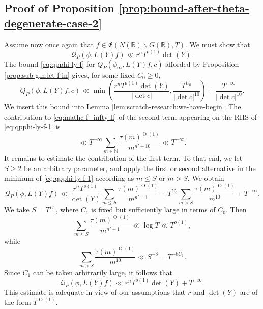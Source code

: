 \documentclass[reqno]{amsart}
\def\O{\operatorname{O}}
\theoremstyle{plain} \newtheorem{theorem} {Theorem}
\theoremstyle{definition} \newtheorem{definition} [theorem] {Definition}
\theoremstyle{itplain} %
\numberwithin{equation}{section}
\numberwithin{theorem}{section}
\renewcommand{\geq}{\geqslant}
\renewcommand{\leq}{\leqslant}
\begin{document}
\subsection{Proof of Proposition \ref{prop:bound-after-theta-degenerate-case-2}}
Assume now once again that $f \in \mathfrak{E}(N(\mathbb{R}) \backslash G(\mathbb{R}), T)$.  We must show that
\begin{equation*}
  \mathcal{Q}_P(\phi,L(Y) f)
  \ll
  r^{n} T^{o(1)} \det(Y).
\end{equation*}
The bound \eqref{eq:qpphi-ly-f} for $Q_P(\phi_\infty, L(Y) f, c)$ afforded by Proposition \ref{prop:sub-gln:let-f-in} gives, for some fixed $C_0 \geq 0$,
\begin{equation}\label{eq:qpphi-ly-f-1}
  Q_P(\phi, L(Y) f, c)
  \ll
  \min
  \left(
    \frac{r^n T^{o(1)} \det(Y) }{|\det c|},
    \frac{T^{C_0}}{|\det c|^{10}} 
  \right)
  +
  \frac{T^{-\infty }}{|\det c|^{10}}.
\end{equation}
We insert this bound into Lemma \ref{lem:scratch-research:we-have-begin}.  The contribution to \eqref{eq:mathc-f_infty-ll} of the second term appearing on the RHS of \eqref{eq:qpphi-ly-f-1} is
\begin{equation*}
  \ll
  T^{-\infty}
  \sum _{m \in \mathbb{N} }
  \frac{\tau(m)^{\O(1)}}{m^{n' + 10}}
  \ll T^{-\infty}.
\end{equation*}
It remains to estimate the contribution of the first term.  To that end, we let $S \geq 2$ be an arbitrary parameter, and apply the first or second alternative in the minimum of \eqref{eq:qpphi-ly-f-1} according as $m \leq S$ or $m > S$.  We obtain
\begin{equation*}
  \mathcal{Q}_P(\phi, L(Y) f)
  \ll
  \frac{r^n T^{o(1)}}{\det(Y)}
  \sum _{m \leq S}
  \frac{\tau(m)^{\O(1)}}{ m^{n' + 1}}
  +
  T^{C_0}
  \sum _{m > S}
  \frac{\tau(m)^{\O(1)}}{m^{10}}
  + T^{-\infty}.
\end{equation*}
We take $S = T^{C_1}$, where $C_1$ is fixed but sufficiently large in terms of $C_0$.  Then
\begin{equation*}
  \sum _{m \leq S} \frac{\tau(m)^{\O(1)}}{ m^{n' + 1}} \ll \log T \ll T^{o(1)},
\end{equation*}
while
\begin{equation*}
  \sum _{m > S} \frac{\tau(m)^{\O(1)}}{m^{10}} \ll S^{-8} = T^{-8 C_1}.
\end{equation*}
Since $C_1$ can be taken arbitrarily large, it follows that
\begin{equation*}
  \mathcal{Q}_P(\phi, L(Y) f)
  \ll
  r^n T^{o(1)} \det(Y) + T^{-\infty}.
\end{equation*}
This estimate is adequate in view of our assumptions that $r$ and $\det(Y)$ are of the form $T^{\O(1)}$.
\end{document}
